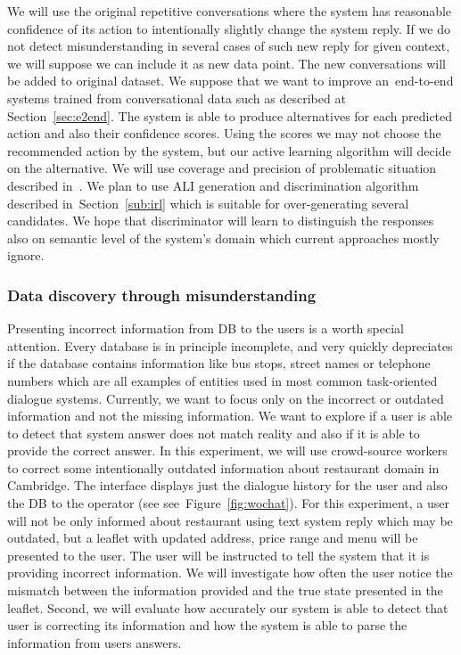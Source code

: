 \documentclass[11pt]{article}
\begin{document}
We will use the original repetitive conversations where the system has reasonable confidence of its action to intentionally slightly change the system reply.
If we do not detect misunderstanding in several cases of such new reply for given context, we will suppose we can include it as new data point. 
The new conversations will be added to original dataset.
We suppose that we want to improve an~end-to-end systems trained from conversational data such as described at Section~\ref{sec:e2end}.
The system is able to produce alternatives for each predicted action and also their confidence scores.
Using the scores we may not choose the recommended action by the system, but our active learning algorithm will decide on the alternative.
We will use coverage and precision of problematic situation described in~\cite{meena_datadriven_2016}.
We plan to use ALI generation and discrimination algorithm described in~Section~\ref{sub:irl} which is suitable for over-generating several candidates.
We hope that discriminator will learn to distinguish the responses also on semantic level of the system's domain which current approaches mostly ignore. 

\subsubsection*{Data discovery through misunderstanding}
Presenting incorrect information from DB to the users is a worth special attention.
Every database is in principle incomplete, and very quickly depreciates if the database contains information like bus stops, street names or telephone numbers which are all examples of entities used in most common task-oriented dialogue systems.
Currently, we want to focus only on the incorrect or outdated information and not the missing information.
We want to explore if a user is able to detect that system answer does not match reality and also if it is able to provide the correct answer.
In this experiment, we will use crowd-source workers to correct some intentionally outdated information about restaurant domain in Cambridge.
The interface displays just the dialogue history for the user and also the DB to the operator (see see~Figure~\ref{fig:wochat}).
For this experiment, a user will not be only informed about restaurant using text system reply which may be outdated, but a leaflet with updated address, price range and menu will be presented to the user.
The user will be instructed to tell the system that it is providing incorrect information.
We will investigate how often the user notice the mismatch between the information provided and the true state presented in the leaflet.
Second, we will evaluate how accurately our system is able to detect that user is correcting its information and how the system is able to parse the information from users answers.
\end{document}
